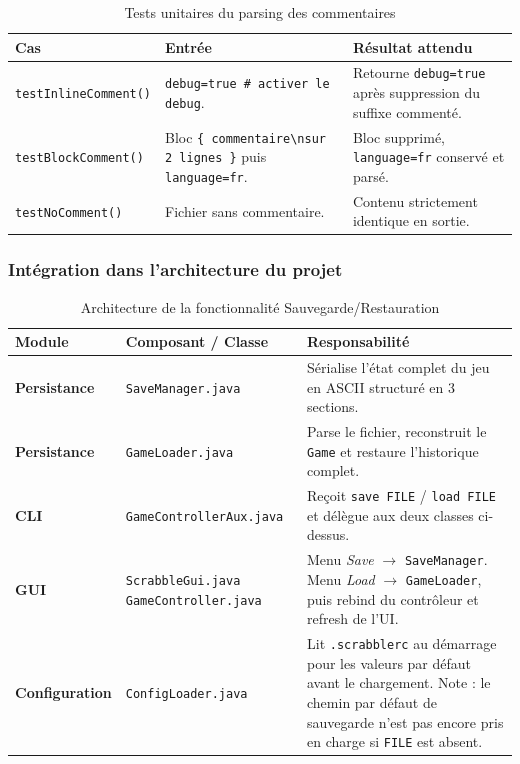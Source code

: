 \documentclass[a4paper]{article}
\begin{document}
\begin{table}[H]
    \centering
    \small
    \begin{tabular}{p{4.5cm} p{4.5cm} p{5.5cm}}
        \toprule
        \textbf{Cas} & \textbf{Entrée} & \textbf{Résultat attendu} \\
        \midrule
        \texttt{testInlineComment()} & \texttt{debug=true \# activer le debug}. & Retourne \texttt{debug=true} après suppression du suffixe commenté. \\
        \midrule
        \texttt{testBlockComment()} & Bloc \texttt{\{ commentaire\textbackslash nsur 2 lignes \}} puis \texttt{language=fr}. & Bloc supprimé, \texttt{language=fr} conservé et parsé. \\
        \midrule
        \texttt{testNoComment()} & Fichier sans commentaire. & Contenu strictement identique en sortie. \\
        \bottomrule
    \end{tabular}
    \caption{Tests unitaires du parsing des commentaires}
\end{table}

\subsubsection{Intégration dans l'architecture du projet}

\begin{table}[H]
    \centering
    \small
    \begin{tabular}{p{3cm} p{4cm} p{7.5cm}}
        \toprule
        \textbf{Module} & \textbf{Composant / Classe} & \textbf{Responsabilité} \\
        \midrule
        \textbf{Persistance} & \texttt{SaveManager.java} & Sérialise l'état complet du jeu en ASCII structuré en 3 sections. \\
        \midrule
        \textbf{Persistance} & \texttt{GameLoader.java} & Parse le fichier, reconstruit le \texttt{Game} et restaure l'historique complet. \\
        \midrule
        \textbf{CLI} & \texttt{GameControllerAux.java} & Reçoit \texttt{save FILE} / \texttt{load FILE} et délègue aux deux classes ci-dessus. \\
        \midrule
        \textbf{GUI} & \texttt{ScrabbleGui.java} \newline \texttt{GameController.java} & Menu \textit{Save} $\rightarrow$ \texttt{SaveManager}. Menu \textit{Load} $\rightarrow$ \texttt{GameLoader}, puis rebind du contrôleur et refresh de l'UI. \\
        \midrule
        \textbf{Configuration} & \texttt{ConfigLoader.java} & Lit \texttt{.scrabblerc} au démarrage pour les valeurs par défaut avant le chargement. \newline Note : le chemin par défaut de sauvegarde n'est pas encore pris en charge si \texttt{FILE} est absent. \\
        \bottomrule
    \end{tabular}
    \caption{Architecture de la fonctionnalité Sauvegarde/Restauration}
\end{table}
\end{document}
